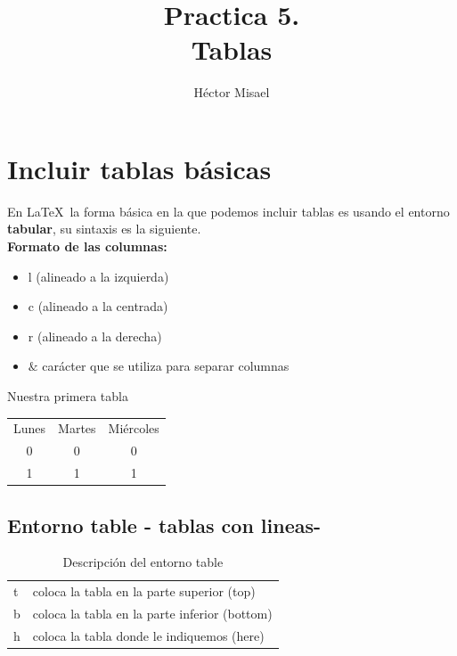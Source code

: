 \documentclass[12pt]{article}
\begin{document}
\title{Practica 5.\\ Tablas}
\author{Héctor Misael}
\date{}
\maketitle
\tableofcontents

\section{Incluir tablas básicas}
En \LaTeX  \, la forma básica en la que podemos incluir tablas es usando el entorno \textbf{tabular}, su sintaxis es la siguiente.\\[0.3cm]
\noindent \textbf{Formato de las columnas:}
\begin{itemize}
\item l (alineado a la izquierda)
\item c (alineado a la centrada)
\item r (alineado a la derecha)
\end{itemize}

\begin{itemize}
\item $ \& $ carácter que se utiliza para separar columnas
\end{itemize}

Nuestra primera tabla \quad
\begin{tabular}{ccc}
Lunes & Martes & Miércoles \\
0     & 0      & 0 \\
1     & 1      & 1
\end{tabular}

\newpage

\subsection{Entorno table - tablas con lineas-}

\begin{table}[!ht]
\centering
\begin{tabular}{ll}
t & coloca la tabla en la parte superior (top)\\ 
b & coloca la tabla en la parte inferior (bottom)\\
h & coloca la tabla donde le indiquemos (here)
\end{tabular}
\caption{Descripción del entorno table}
\label{Tabla1}
\end{table}
\end{document}
